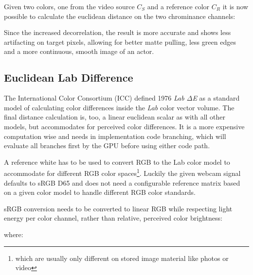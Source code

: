 Given two colors, one from the video source $C_S$ and a reference color $C_R$ 
it is now possible to calculate the euclidean distance on the two chrominance 
channels:


Since the increased decorrelation, the result is more accurate and shows less 
artifacting on target pixels, allowing for better matte pulling, less 
green edges and a more continuous, smooth image of an actor.

\subsection{Euclidean Lab Difference}
The International Color Consortium (ICC) defined 1976 \textit{Lab $\Delta$E} as 
a standard model of calculating color differences inside the \textit{Lab} color 
vector volume. The final distance calculation is, too, a linear euclidean 
scalar as with all other models, but accommodates for perceived color 
differences. It is a more expensive computation wise and needs in 
implementation code branching, which will evaluate all branches first by the 
GPU before using either code path.

A reference white has to be used to convert RGB to the Lab color model to 
accommodate for different RGB color spaces\footnote{which are usually only 
different on stored image material like photos or video}. Luckily the given 
webcam signal defaults to sRGB D65 and does not need a configurable reference 
matrix based on a given color model to handle different RGB color standards.

sRGB conversion needs to be converted to linear RGB while respecting light 
energy per color channel, rather than relative, perceived color brightness: 


where: 


